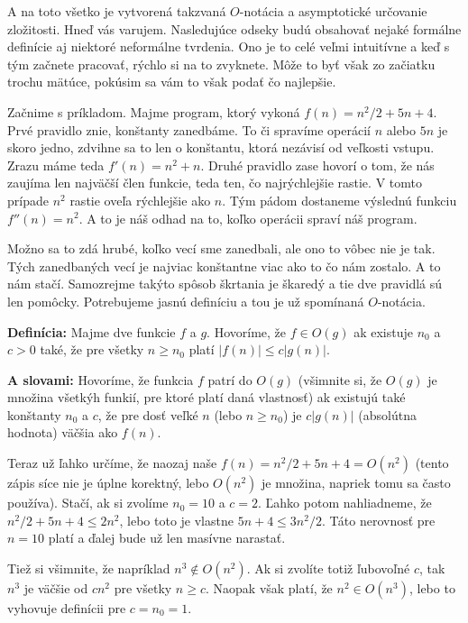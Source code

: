 A na toto všetko je vytvorená takzvaná $O$-notácia a asymptotické určovanie zložitosti.
Hneď vás varujem. Nasledujúce odseky budú obsahovať nejaké formálne definície aj niektoré neformálne
tvrdenia. Ono je to celé veľmi intuitívne a keď s tým začnete pracovať, rýchlo si na to zvyknete.
Môže to byť však zo začiatku trochu mätúce, pokúsim sa vám to však podať čo najlepšie.


Začnime s príkladom. Majme program, ktorý vykoná $f(n) = n^2/2 + 5n + 4$. Prvé pravidlo znie,
konštanty zanedbáme. To či spravíme operácií $n$ alebo $5n$ je skoro jedno, zdvihne sa to len o
konštantu, ktorá nezávisí od veľkosti vstupu. Zrazu máme teda $f'(n) = n^2 + n$. Druhé pravidlo zase
hovorí o tom, že nás zaujíma len najväčší člen funkcie, teda ten, čo najrýchlejšie rastie. V tomto
prípade $n^2$ rastie oveľa rýchlejšie ako $n$. Tým pádom dostaneme výslednú funkciu $f''(n) = n^2$.
A to je náš odhad na to, koľko operácii spraví náš program.

Možno sa to zdá hrubé, koľko vecí sme zanedbali, ale ono to vôbec nie je tak. Tých zanedbaných vecí
je najviac konštantne viac ako to čo nám zostalo. A to nám stačí. Samozrejme takýto spôsob škrtania
je škaredý a tie dve pravidlá sú len pomôcky. Potrebujeme jasnú definíciu a tou je už spomínaná
$O$-notácia.

\textbf{Definícia:} Majme dve funkcie $f$ a $g$. Hovoríme, že $f \in O(g)$ ak existuje $n_0$ a $c>0$
také, že pre všetky $n \geq n_0$ platí $|f(n)|\leq c|g(n)|$.

\textbf{A slovami:} Hovoríme, že funkcia $f$ patrí do $O(g)$ (všimnite si, že $O(g)$ je množina
všetkýh funkií, pre ktoré platí daná vlastnosť) ak existujú také konštanty $n_0$ a $c$, že pre dosť veľké $n$ (lebo $n \geq n_0$) je
$c|g(n)|$ (absolútna hodnota) väčšia ako $f(n)$.

Teraz už ľahko určíme, že naozaj naše $f(n) = n^2/2 + 5n +4 = O(n^2)$ (tento zápis síce nie je úplne
korektný, lebo $O(n^2)$ je množina, napriek tomu sa často používa). Stačí, ak si zvolíme $n_0=10$ a
$c=2$. Ľahko potom nahliadneme, že $n^2/2 + 5n + 4 \leq 2n^2$, lebo toto je vlastne $5n + 4 \leq
3n^2/2$. Táto nerovnosť pre $n=10$ platí a ďalej bude už len masívne narastať.

Tiež si všimnite, že napríklad $n^3 \notin O(n^2)$. Ak si zvolíte totiž ľubovoľné $c$, tak $n^3$ je
väčšie od $cn^2$ pre všetky $n\geq c$. Naopak však platí, že $n^2 \in O(n^3)$, lebo to vyhovuje
definícii pre $c=n_0=1$.

